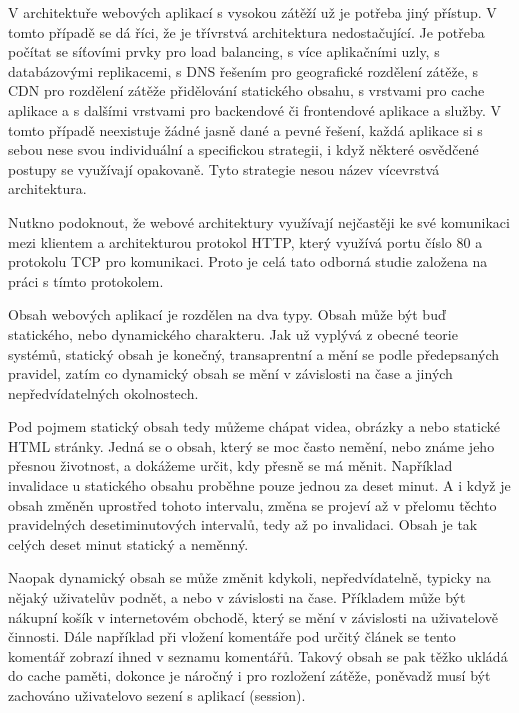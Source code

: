 \documentclass[12pt]{article}
\begin{document}
\obrazek
{}

V architektuře webových aplikací s vysokou zátěží už je potřeba jiný přístup. V tomto případě se dá říci, že je třívrstvá architektura nedostačující. Je potřeba počítat se síťovími prvky pro load balancing, s více aplikačními uzly, s databázovými replikacemi, s DNS řešením pro geografické rozdělení zátěže, s CDN pro rozdělení zátěže přidělování statického obsahu, s vrstvami pro cache aplikace a s dalšími vrstvami pro backendové či frontendové aplikace a služby. V tomto případě neexistuje žádné jasně dané a pevné řešení, každá aplikace si s sebou nese svou individuální a specifickou strategii, i když některé osvědčené postupy se využívají opakovaně. Tyto strategie nesou název vícevrstvá architektura.

\obrazek
{}

Nutkno podoknout, že webové architektury využívají nejčastěji ke své komunikaci mezi klientem a architekturou protokol HTTP, který využívá portu číslo 80 a protokolu TCP pro komunikaci. Proto je celá tato odborná studie založena na práci s tímto protokolem.

Obsah webových aplikací je rozdělen na dva typy. Obsah může být buď statického, nebo dynamického charakteru. Jak už vyplývá z obecné teorie systémů, statický obsah je konečný, transaprentní a mění se podle předepsaných pravidel, zatím co dynamický obsah se mění v závislosti na čase a jiných nepředvídatelných okolnostech. 

Pod pojmem statický obsah tedy můžeme chápat videa, obrázky a nebo statické HTML stránky. Jedná se o obsah, který se moc často nemění, nebo známe jeho přesnou životnost, a dokážeme určit, kdy přesně se má měnit. Například invalidace u statického obsahu proběhne pouze jednou za deset minut. A i když je obsah změněn uprostřed tohoto intervalu, změna se projeví až v přelomu těchto pravidelných desetiminutových intervalů, tedy až po invalidaci. Obsah je tak celých deset minut statický a neměnný.

Naopak dynamický obsah se může změnit kdykoli, nepředvídatelně, typicky na nějaký uživatelův podnět, a nebo v závislosti na čase. Příkladem může být nákupní košík v internetovém obchodě, který se mění v závislosti na uživatelově činnosti. Dále například při vložení komentáře pod určitý článek se tento komentář zobrazí ihned v seznamu komentářů. Takový obsah se pak těžko ukládá do cache paměti, dokonce je náročný i pro rozložení zátěže, poněvadž musí být zachováno uživatelovo sezení s aplikací (session).
\end{document}
